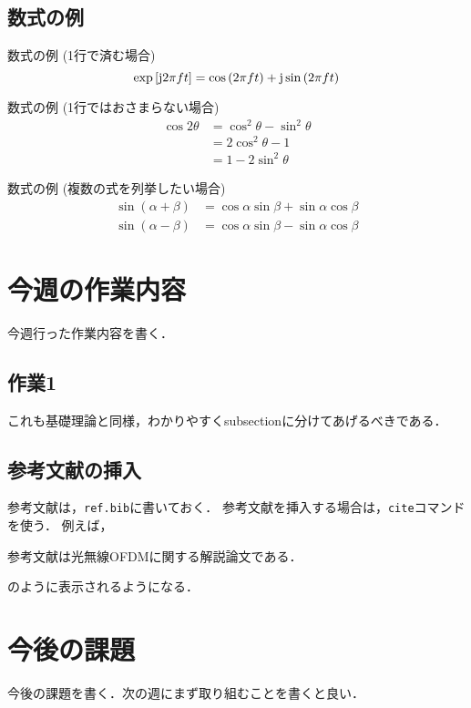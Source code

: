 \documentclass[fleqn, a4paper, twocolumn]{ltjsarticle}
\numberwithin{figure}{section}
\numberwithin{table}{section}
\numberwithin{equation}{section}
\begin{document}
\subsection{数式の例}
数式の例 (1行で済む場合)
\begin{equation}
	\exp \qty[\mathrm{j}2\pi ft] = \cos \qty(2\pi ft) + \mathrm{j}\sin \qty(2\pi ft)
	\label{eq: euler}
\end{equation}

数式の例 (1行ではおさまらない場合)
\begin{equation}
	\begin{split}
		\cos 2\theta & = \cos^2\theta-\sin^2\theta \\ %
		             & = 2\cos^2\theta - 1         \\         %
		             & = 1 - 2\sin^2\theta         %
		\label{eq: doubleangle}
	\end{split}
\end{equation}

数式の例 (複数の式を列挙したい場合)
\begin{align}
	\sin (\alpha + \beta) & = \cos \alpha \sin \beta + \sin \alpha \cos \beta \\
	\sin (\alpha - \beta) & = \cos \alpha \sin \beta - \sin \alpha \cos \beta
\end{align}

\section{今週の作業内容}
今週行った作業内容を書く．
\subsection{作業1}
これも基礎理論と同様，わかりやすくsubsectionに分けてあげるべきである．

\subsection{参考文献の挿入}
参考文献は，\texttt{ref.bib}に書いておく．
参考文献を挿入する場合は，\texttt{cite}コマンドを使う．
例えば，

参考文献\cite{ohuchi2019}は光無線OFDMに関する解説論文である．

のように表示されるようになる．

\section{今後の課題}
今後の課題を書く．次の週にまず取り組むことを書くと良い．

\end{document}
